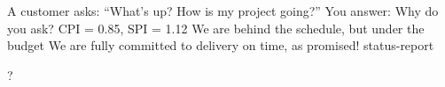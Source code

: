\documentclass{article}
\begin{document}

\pmbaQuestion
  {A customer asks: ``What's up? How is my project going?'' You answer:}
  {Why do you ask?}
  {CPI = 0.85, SPI = 1.12}
  {We are behind the schedule, but under the budget}
  {We are fully committed to delivery on time, as promised!}
  {status-report}

\pmbaQuestion
  {}
  {}
  {}
  {}
  {}
  {?}

\end{document}
